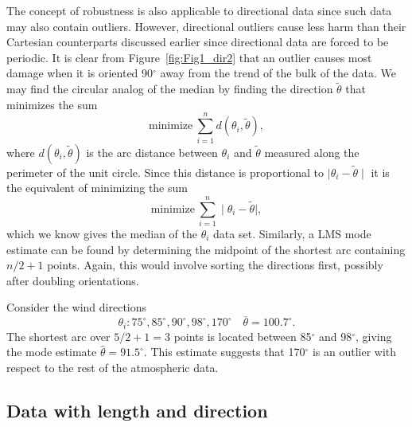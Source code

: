 	The concept of robustness is also applicable to directional data since such data may also contain outliers.
However, directional outliers cause less harm than their Cartesian counterparts discussed earlier since directional data are forced
to be periodic.  It is clear from Figure~\ref{fig:Fig1_dir2} that an outlier causes most damage when it is oriented
90$^{\circ}$ away from the trend of the bulk of the data.
We may find the circular analog of the median by finding the direction $\tilde{\theta}$ that minimizes the sum
\begin{equation}
\mbox{minimize} \  \sum^n_{i=1} d \left( \theta_i, \tilde{ \theta} \right),
\end{equation}
where $d\left( \theta_i, \tilde{\theta}\right)$ is the arc distance between $\theta_i$ and 
$ \tilde{ \theta} $ measured along the perimeter of the unit circle.  Since this distance is proportional
to $\mid \theta_i - \tilde{ \theta} \mid$   it is the equivalent of minimizing the sum
\begin{equation}
\mbox{minimize}  \ \sum^n_{i=1} \mid \theta_i - \tilde{ \theta} \mid,
\end{equation}
which we know gives the median of the $ \theta_i$ data set.  Similarly, a LMS mode estimate can be found by
determining the midpoint of the shortest arc containing $n/2+1$ points.  Again, this would involve sorting
the directions first, possibly after doubling orientations.
\begin{example}
Consider the wind directions
$$
\theta_i: 75^{\circ}, 85^{\circ}, 90^{\circ}, 98^{\circ}, 170^{\circ} \quad 
\bar{ \theta}=100.7^{\circ}.
$$	 
The shortest arc over $5/2+1=3$ points is located between 85$^{\circ}$ and 98$^{\circ}$, giving the mode
estimate $\hat{\theta} = 91.5^{\circ}$. This estimate suggests that 170$^{\circ}$ is an outlier
with respect to the rest of the atmospheric data.
\end{example}

\subsection{Data with length and direction}

